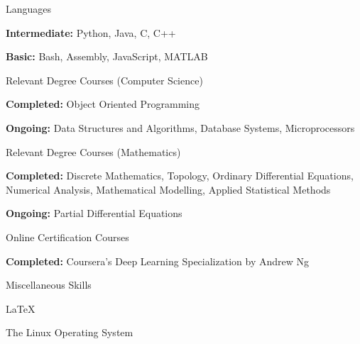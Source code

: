 
\begin{cventries}
  \cventry
    {} %
    {Languages} %
    {} %
    {} %
    {
      \begin{cvitems} %
        \item {\textbf{Intermediate:} Python, Java, C, C++}
        \item{\textbf{Basic:} Bash, Assembly, JavaScript, MATLAB}
      \end{cvitems}
    }
    
    \cventry
    {} %
    {Relevant Degree Courses (Computer Science)} %
    {} %
    {} %
    {
      \begin{cvitems} %
        \item {\textbf{Completed:} Object Oriented Programming}
        \item{\textbf{Ongoing:} Data Structures and Algorithms, Database Systems, Microprocessors}
      \end{cvitems}
    }
    
    \cventry
    {} %
    {Relevant Degree Courses (Mathematics)} %
    {} %
    {} %
    {
      \begin{cvitems} %
        \item {\textbf{Completed:} Discrete Mathematics, Topology, Ordinary Differential Equations, \newline Numerical Analysis, Mathematical Modelling, Applied Statistical Methods}
        \item{\textbf{Ongoing:} Partial Differential Equations}
      \end{cvitems}
    }
    
    \cventry
    {} %
    {Online Certification Courses} %
    {} %
    {} %
    {
      \begin{cvitems} %
        \item {\textbf{Completed:} Coursera's Deep Learning Specialization by Andrew Ng}
      \end{cvitems}
    }
    
    \cventry
    {} %
    {Miscellaneous Skills} %
    {} %
    {} %
    {
      \begin{cvitems} %
        \item {LaTeX}
        \item {The Linux Operating System}
      \end{cvitems}
    }
    
\end{cventries}